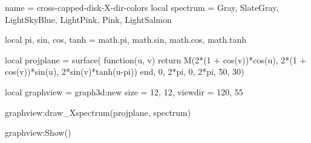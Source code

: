 \documentclass{standalone}
\begin{document}
\begin{luadraw}{name = cross-capped-disk-X-dir-colors}
local spectrum = {Gray, SlateGray, LightSkyBlue, LightPink, Pink, LightSalmon}

local pi, sin, cos, tanh = math.pi, math.sin, math.cos, math.tanh

local projplane = surface(
  function(u, v)
    return M(2*(1 + cos(v))*cos(u), 2*(1 + cos(v))*sin(u), 2*sin(v)*tanh(u-pi))
  end,
  0, 2*pi, 0,  2*pi,
  {50, 30})

local graphview = graph3d:new{
  size    = {12, 12},
  viewdir = {120, 55}
}

graphview:draw_Xspectrum(projplane, spectrum)

graphview:Show()
\end{luadraw}
\end{document}
